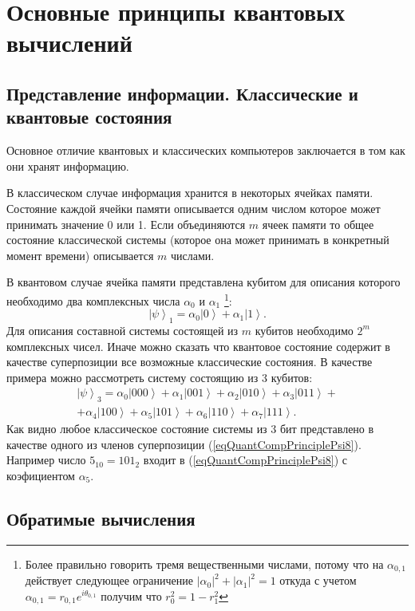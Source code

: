 \section{Основные принципы квантовых вычислений}

\subsection{Представление информации. Классические и квантовые
  состояния}
Основное отличие квантовых и классических компьютеров заключается в
том как они хранят информацию. 

В классическом случае информация хранится в некоторых ячейках
памяти. Состояние каждой ячейки памяти описывается одним числом
которое может принимать значение 0 или 1. Если объединяются $m$ ячеек
памяти то общее состояние классической системы (которое она может
принимать в конкретный момент времени) описывается $m$ числами.

В квантовом случае ячейка памяти представлена кубитом для описания
которого необходимо два комплексных числа $\alpha_0$ и $\alpha_1$
\footnote{Более правильно говорить тремя вещественными числами, потому
что на $\alpha_{0,1}$ действует следующее ограничение 
$\left|\alpha_0\right|^2 + \left|\alpha_1\right|^2 = 1$ откуда с
учетом $\alpha_{0,1} = r_{0,1}e^{i \theta_{0,1}}$ получим что $r_0^2 =
1 - r_1^2$}:
\[
\left|\psi\right>_1 = \alpha_0 \left| 0 \right> + \alpha_1 \left| 1 \right>.
\]
Для описания составной системы состоящей из $m$ кубитов необходимо
$2^m$ комплексных чисел. Иначе можно сказать что квантовое состояние
содержит в качестве суперпозиции все возможные классические
состояния. В качестве примера можно рассмотреть систему состоящию из 3
кубитов:
\begin{eqnarray}
\left|\psi\right>_3 = 
\alpha_0 \left| 000 \right> + 
\alpha_1 \left| 001 \right> + 
\alpha_2 \left| 010 \right> + 
\alpha_3 \left| 011 \right> + 
\nonumber \\
+ 
\alpha_4 \left| 100 \right> + 
\alpha_5 \left| 101 \right> + 
\alpha_6 \left| 110 \right> + 
\alpha_7 \left| 111 \right>.
\label{eqQuantCompPrinciplePsi8}
\end{eqnarray}
Как видно любое классическое состояние системы из 3 бит представлено в
качестве одного из членов суперпозиции
(\ref{eqQuantCompPrinciplePsi8}). Например число $5_{10}=101_2$ входит
в (\ref{eqQuantCompPrinciplePsi8}) с коэфициентом $\alpha_5$.

\subsection{Обратимые вычисления}

